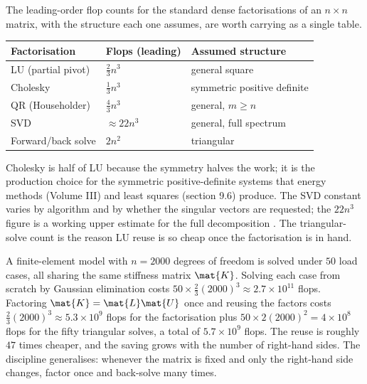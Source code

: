 \begin{mastery}
The leading-order flop counts for the standard dense factorisations
of an $n \times n$ matrix, with the structure each one assumes, are
worth carrying as a single table.
\begin{center}
\begin{tabular}{lll}
\toprule
Factorisation & Flops (leading) & Assumed structure \\
\midrule
LU (partial pivot) & $\tfrac{2}{3}n^{3}$ & general square \\
Cholesky & $\tfrac{1}{3}n^{3}$ & symmetric positive definite \\
QR (Householder) & $\tfrac{4}{3}n^{3}$ & general, $m \geq n$ \\
SVD & $\approx 22 n^{3}$ & general, full spectrum \\
Forward/back solve & $2n^{2}$ & triangular \\
\bottomrule
\end{tabular}
\end{center}
Cholesky is half of LU because the symmetry halves the work; it is
the production choice for the symmetric positive-definite systems
that energy methods (Volume III) and least squares (section 9.6)
produce. The SVD constant varies by algorithm and by whether the
singular vectors are requested; the $22 n^{3}$ figure is a working
upper estimate for the full decomposition
\cite[ch.~31]{text:trefethen-bau1997}. The triangular-solve count is
the reason LU reuse is so cheap once the factorisation is in hand.
\end{mastery}

\begin{example}
A finite-element model with $n = 2000$ degrees of freedom is solved
under $50$ load cases, all sharing the same stiffness matrix
$\mat{K}$. Solving each case from scratch by Gaussian elimination
costs $50 \times \tfrac{2}{3}(2000)^{3} \approx 2.7 \times 10^{11}$
flops. Factoring $\mat{K} = \mat{L}\mat{U}$ once and reusing the
factors costs $\tfrac{2}{3}(2000)^{3} \approx 5.3 \times 10^{9}$
flops for the factorisation plus $50 \times 2(2000)^{2} = 4 \times
10^{8}$ flops for the fifty triangular solves, a total of $5.7
\times 10^{9}$ flops. The reuse is roughly $47$ times cheaper, and
the saving grows with the number of right-hand sides. The discipline
generalises: whenever the matrix is fixed and only the right-hand
side changes, factor once and back-solve many times.
\end{example}


